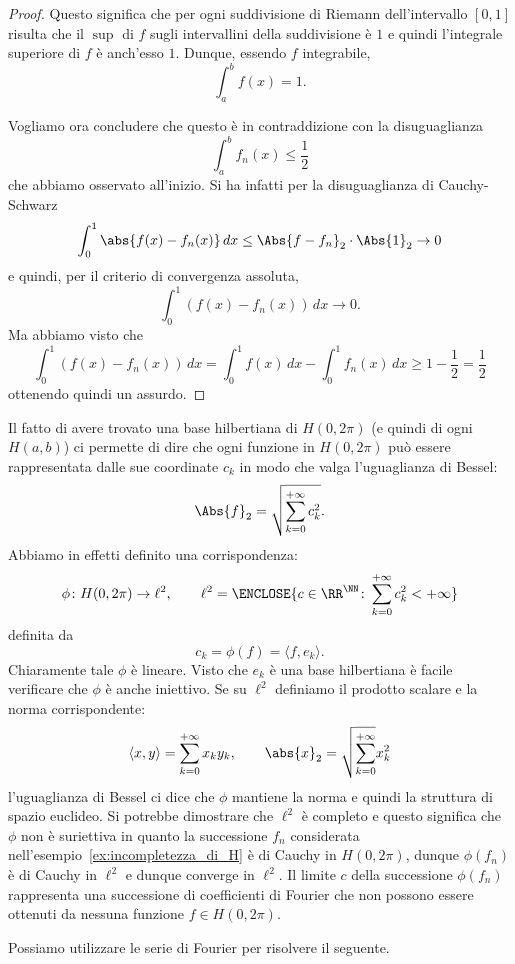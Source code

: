 \begin{proof}
Questo significa che per ogni suddivisione di Riemann dell'intervallo $[0,1]$
risulta che il $\sup$ di $f$ sugli intervallini della suddivisione è $1$ e quindi
l'integrale superiore di $f$ è anch'esso $1$. 
Dunque, essendo $f$ integrabile,
\[
  \int_a^b f(x) = 1.
\]

Vogliamo ora concludere che questo è in contraddizione con la disuguaglianza
\[
  \int_a^b f_n(x) \le \frac 1 2
\]
che abbiamo osservato all'inizio.
Si ha infatti per la disuguaglianza di Cauchy-Schwarz
\begin{align*}
  \int_0^1 \abs{f(x)-f_n(x)}\, dx
  \le \Abs{f-f_n}_2\cdot \Abs{1}_2  \to 0
\end{align*}
e quindi, per il criterio di convergenza assoluta,
\[
  \int_0^1 (f(x) - f_n(x))\, dx \to 0.
\]
Ma abbiamo visto che
\[
  \int_0^1 (f(x) - f_n(x))\, dx
  = \int_0^1 f(x)\, dx - \int_0^1 f_n(x)\, dx
  \ge 1 - \frac 1 2 = \frac 1 2
\]
ottenendo quindi un assurdo.
\end{proof}

Il fatto di avere trovato una base hilbertiana di $H(0,2\pi)$ (e quindi
di ogni $H(a,b)$) ci permette di
dire che ogni funzione in $H(0,2\pi)$ può essere rappresentata dalle sue
coordinate $c_k$ in modo che valga l'uguaglianza di Bessel:
\[
  \Abs{f}_2 = \sqrt{\sum_{k=0}^{+\infty} c_k^2}.
\]
Abbiamo in effetti definito una corrispondenza:
\[
  \phi \colon H(0,2\pi) \to \ell^2,
  \qquad
  \ell^2=\ENCLOSE{c\in \RR^\NN \colon \sum_{k=0}^{+\infty} c_k^2<+\infty}
\]
definita da
\[
  c_k = \phi(f) = \langle f, e_k\rangle.
\]
Chiaramente tale $\phi$ è lineare. Visto che $e_k$ è una base hilbertiana
è facile verificare che $\phi$ è anche iniettivo. Se su $\ell^2$
definiamo il prodotto scalare e la norma corrispondente:
\[
  \langle x,y\rangle = \sum_{k=0}^{+\infty} x_k y_k, \qquad
  \abs{x}_2 = \sqrt{\sum_{k=0}^{+\infty}} x_k^2
\]
l'uguaglianza di Bessel ci dice che $\phi$ mantiene la norma e quindi
la struttura di spazio euclideo. Si potrebbe dimostrare che $\ell^2$
è completo e questo significa che $\phi$ non è suriettiva in quanto
la successione $f_n$
considerata nell'esempio~\ref{ex:incompletezza_di_H}
è di Cauchy in $H(0,2\pi)$, dunque $\phi(f_n)$ è di Cauchy in $\ell^2$
e dunque converge in $\ell^2$. Il limite $c$ della successione $\phi(f_n)$
rappresenta una successione di coefficienti di Fourier che non possono
essere ottenuti da nessuna funzione $f\in H(0,2\pi)$.

Possiamo utilizzare le serie di Fourier per risolvere 
il seguente.

